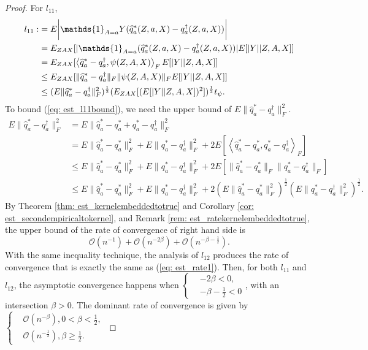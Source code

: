 \begin{proof}
    For $l_{11}$, 
    \begin{align}
        \label{eq: est_l11bound}
        l_{11}:&= E\bigg|\mathds{1}_{A=a}Y(\widehat{q}^*_a(Z,a,X)-q_a^{\dagger}(Z,a,X))\bigg| \notag\\
               &= E_{ZAX}[|\mathds{1}_{A=a}(\widehat{q}^*_a(Z,a,X)-q_a^{\dagger}(Z,a,X))|E[|Y||Z,A,X]] \notag\\
               &= E_{ZAX}[\left\langle \widehat{q}^*_a-q_a^{\dagger}, \psi(Z,A,X)\right\rangle_FE[|Y||Z,A,X]] \notag\\
               &\leq E_{ZAX}[\|\widehat{q}^*_a-q_a^{\dagger}\|_F\|\psi(Z,A,X)\|_FE[|Y||Z,A,X]] \notag\\
               &\leq (E\|\widehat{q}^*_a-q_a^{\dagger}\|_F^2)^{\frac{1}{2}}(E_{ZAX}[(E[|Y||Z,A,X])^2])^{\frac{1}{2}}t_{\psi}.
    \end{align}
    To bound (\ref{eq: est_l11bound}), we need the upper bound of $E\|\widehat{q}^*_a-q_a^{\dagger}\|_F^2$. 
    \begin{align*}
        E\|\widehat{q}^*_a-q_a^{\dagger}\|_F^2 &= E\|\widehat{q}^*_a-q_a^*+q_a^*-q_a^{\dagger}\|_F^2 \\
                                               &= E\|\widehat{q}^*_a-q_a^*\|_F^2 + E\|q_a^*-q_a^{\dagger}\|_F^2 + 2E\left[\left\langle \widehat{q}^*_a-q_a^*, q_a^*-q_a^{\dagger}\right\rangle _F\right] \\
                                               &\leq E\|\widehat{q}^*_a-q_a^*\|_F^2 + E\|q_a^*-q_a^{\dagger}\|_F^2 + 2E\left[\|\widehat{q}^*_a-q_a^*\|_F\|q_a^*-q_a^{\dagger}\|_F\right] \\
                                               &\leq E\|\widehat{q}^*_a-q_a^*\|_F^2 + E\|q_a^*-q_a^{\dagger}\|_F^2 + 2\left(E\|\widehat{q}^*_a-q_a^*\|_F^2\right)^{\frac{1}{2}} \left(E\|q_a^*-q_a^{\dagger}\|_F^2\right)^{\frac{1}{2}}. 
    \end{align*}
    By Theorem \ref{thm: est_kernelembeddedtotrue} and Corollary \ref{cor: est_secondempiricaltokernel}, and Remark \ref{rem: est_ratekernelembeddedtotrue}, 
    the upper bound of the rate of convergence of right hand side is 
    \begin{equation}
        \label{eq: est_rate1}
        \mathcal{O}(n^{-1})+\mathcal{O}(n^{-2\beta})+\mathcal{O}(n^{-\beta-\frac{1}{2}}).
    \end{equation} 
    With the same inequality technique, the analysis of $l_{12}$ produces the rate of convergence that is exactly the same as (\ref{eq: est_rate1}). 
    Then, for both $l_{11}$ and $l_{12}$,  
    the asymptotic convergence happens when $\left\{\begin{aligned}
        &-2\beta<0, \\
        &-\beta-\frac{1}{2}<0
    \end{aligned}\right.$, 
    with an intersection $\beta>0$. 
    The dominant rate of convergence is given by $\left\{\begin{aligned}
        & \mathcal{O}(n^{-\beta}), 0<\beta<\frac{1}{2}, \\
        & \mathcal{O}(n^{-\frac{1}{2}}), \beta\geq \frac{1}{2}.
    \end{aligned}\right.$


\end{proof}
